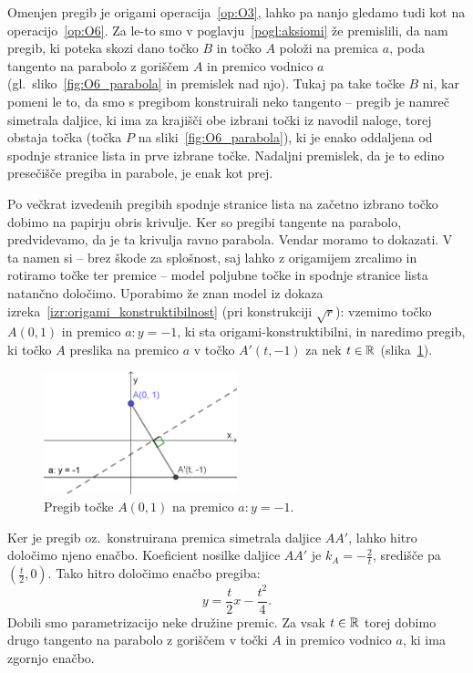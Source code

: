 Omenjen pregib je origami operacija~\ref{op:O3}, lahko pa nanjo gledamo tudi kot na operacijo~\ref{op:O6}. Za le-to smo v poglavju~\ref{pogl:aksiomi} že premislili, da nam pregib, ki poteka skozi dano točko $B$ in točko $A$ položi na premica $a$, poda tangento na parabolo z goriščem $A$ in premico vodnico $a$ (gl.\ sliko~\ref{fig:O6_parabola} in premislek nad njo). Tukaj pa take točke $B$ ni, kar pomeni le to, da smo s pregibom konstruirali neko tangento -- pregib je namreč simetrala daljice, ki ima za krajišči obe izbrani točki iz navodil naloge, torej obstaja točka (točka $P$ na sliki~\ref{fig:O6_parabola}), ki je enako oddaljena od spodnje stranice lista in prve izbrane točke. Nadaljni premislek, da je to edino presečišče pregiba in parabole, je enak kot prej.

Po večkrat izvedenih pregibih spodnje stranice lista na začetno izbrano točko dobimo na papirju obris krivulje. Ker so pregibi tangente na parabolo, predvidevamo, da je ta krivulja ravno parabola. Vendar moramo to dokazati. V ta namen si -- brez škode za splošnost, saj lahko z origamijem zrcalimo in rotiramo točke ter premice -- model poljubne točke in  spodnje stranice lista natančno določimo. Uporabimo že znan model iz dokaza izreka~\ref{izr:origami_konstruktibilnost} (pri konstrukciji $\sqrt{r}$): vzemimo točko $A(0, 1)$ in premico $a: y = -1$, ki sta origami-konstruktibilni, in naredimo pregib, ki točko $A$ preslika na premico $a$ v točko $A'(t, -1)$ za nek $t \in \mathbb R$ (slika~\ref{fig:enacba_tangente_par1}).

\begin{figure}[h]
    \centering
    \includegraphics[width=0.5\textwidth]{images/enacba_parabole1.png}
    \caption[Enačba tangente na parabolo]{Pregib točke $A(0, 1)$ na premico $a: y = -1$.}
    \label{fig:enacba_tangente_par1}
\end{figure}

Ker je pregib oz.\ konstruirana premica simetrala daljice $AA'$, lahko hitro določimo njeno enačbo. Koeficient nosilke daljice $AA'$ je $k_A = -\frac{2}{t}$, središče pa $(\frac{t}{2}, 0)$. Tako hitro določimo enačbo pregiba:
\begin{equation}
    y = \frac{t}{2} x - \frac{t^2}{4}.
    \label{eq:tang_par}
\end{equation}
Dobili smo parametrizacijo neke družine premic. Za vsak $t \in \mathbb R$ torej dobimo drugo tangento na parabolo z goriščem v točki $A$ in premico vodnico $a$, ki ima zgornjo enačbo.

